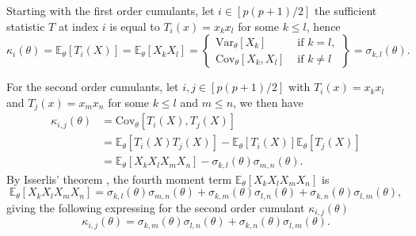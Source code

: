 Starting with the first order cumulants, let $i \in [p(p+1)/2]$ the sufficient statistic $T$ at index $i$ is equal to $T_i(x) = x_kx_l$ for some $k \leq l$, hence
\begin{equation*}
    \kappa_i(\theta) 
    = \mathbb{E}_\theta\left[T_i(X)\right]
    = \mathbb{E}_\theta\left[X_kX_l  \right]
    = \left\{
        \begin{array}{cc}
            \text{Var}_\theta[X_k]      & \text{ if } k = l,\\
            \text{Cov}_\theta[X_k, X_l] & \text{ if } k \neq l
        \end{array}
    \right\}
    = \sigma_{k, l}(\theta).
\end{equation*}

For the second order cumulants, let $i, j \in [p(p+1)/2]$ with $T_i(x) = x_kx_l$ and $T_j(x) = x_mx_n$ for some $k \leq l$ and $m \leq n$, we then have
\begin{align*}
    \kappa_{i,j}(\theta)
    &= \text{Cov}_\theta\left[T_i(X), T_j(X)\right]\\
    &= \mathbb{E}_\theta\left[T_i(X)T_j(X)\right] - \mathbb{E}_\theta\left[T_i(X)\right]\mathbb{E}_\theta\left[T_j(X)\right]\\
    &= \mathbb{E}_\theta\left[X_kX_lX_mX_n\right] - \sigma_{k, l}(\theta)\sigma_{m, n}(\theta).
\end{align*}
By Isserlis' theorem \cite{Isserlis1918}, the fourth moment term $\mathbb{E}_\theta\left[X_kX_lX_mX_n\right]$ is
\begin{equation*}
    \mathbb{E}_\theta\left[X_kX_lX_mX_n\right] = \sigma_{k,l}(\theta)\sigma_{m,n}(\theta) + \sigma_{k,m}(\theta)\sigma_{l,n}(\theta) + \sigma_{k,n}(\theta)\sigma_{l,m}(\theta),
\end{equation*}
giving the following expressing for the second order cumulant $\kappa_{i,j}(\theta)$
\begin{equation*}
    \kappa_{i,j}(\theta) = \sigma_{k,m}(\theta)\sigma_{l,n}(\theta) + \sigma_{k,n}(\theta)\sigma_{l,m}(\theta).
\end{equation*}